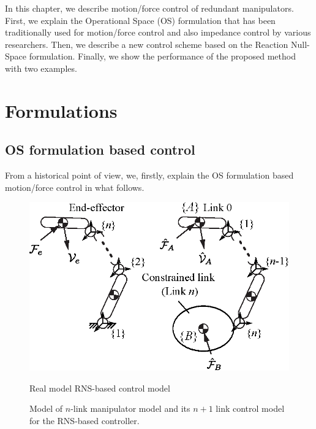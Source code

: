 %


In this chapter,
we describe motion/force control of redundant manipulators.
First, we explain the Operational Space (OS) formulation that has been traditionally used
for motion/force control and also impedance control by various researchers.
Then, we describe a new control scheme based on the Reaction Null-Space formulation.
Finally, we show the performance of the proposed method with two examples.


\section{Formulations}

\subsection{OS formulation based control}
From a historical point of view,
we, firstly, explain the OS formulation based motion/force control in what follows.

%
\begin{figure}[t]
  \centering
  \begin{minipage}[h]{0.7\linewidth}
    \centering
    \includegraphics[width=1.0\linewidth]{fig/chapter6/models.eps}
    \footnotesize\par{Real model \hspace{8em} RNS-based control model}
  \end{minipage}
  \caption{Model of $n$-link manipulator model and its $n+1$ link control model for the RNS-based controller.}
  \label{fig:MODEL_MF}
\end{figure}
%
